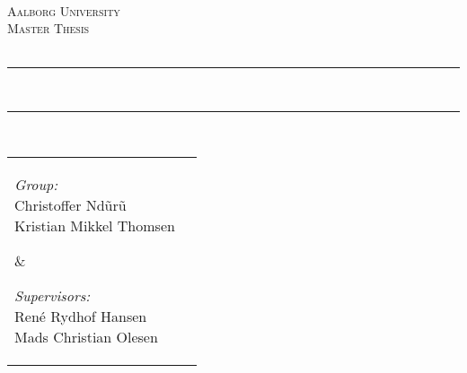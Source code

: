 %
\thispagestyle{empty}

\newcommand{\HRule}{\rule{\linewidth}{0.5mm}} %

\begin{center}
\textsc{}\\[0.5cm]

\textsc{\LARGE Aalborg University}\\[0.8cm]
\textsc{\Large Master Thesis}\\[0.4cm]
\textsc{\large \projectsubject}\\[0.6cm]

\HRule \\[0.4cm]
{ \huge \bfseries \projecttitle}
\HRule \\[1.3cm]
\begin{tabular}{lr}
\hspace{\fill}\parbox[t]{2.85in}{
\emph{Group:}\\[0.20cm]
    Christoffer Nd\~{u}r\~{u}\\[0.20cm]
    Kristian Mikkel Thomsen
}
&
\hspace{\fill}\parbox[t]{2.85in}{
\emph{Supervisors:}\\[0.20cm]
 René Rydhof Hansen \\ [0.20cm]
 Mads Christian Olesen
}
\hspace{-4in}
\end{tabular}
\begin{minipage}{0.4\textwidth}
\begin{flushleft} \large
\end{flushleft}
\end{minipage} 
~
\begin{minipage}{0.4\textwidth}
\begin{flushright} \large
\end{flushright}
\end{minipage}\\[1.5cm]





\end{center}

